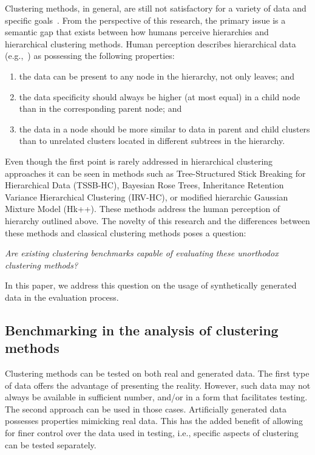 \documentclass{article}
\begin{document}
Clustering methods, in general, are still not satisfactory for a variety of data and specific goals~\cite{blundell2010discovering}. From the perspective of this research, the primary issue is a semantic gap that exists between how humans perceive hierarchies and hierarchical clustering methods. Human perception describes hierarchical data (e.g.,~\cite{ILSVRC15}) as possessing the following properties:
\begin{enumerate}
    \item the data can be present to any node in the hierarchy, not only leaves; and
    \item the data specificity should always be higher (at most equal) in a child node than in the corresponding parent node; and
    \item the data in a node should be more similar to data in parent and child clusters than to unrelated clusters located in different subtrees in the hierarchy.
\end{enumerate}

Even though the first point is rarely addressed in hierarchical clustering approaches it can be seen in methods such as Tree-Structured Stick Breaking for Hierarchical Data (TSSB-HC)\cite{ghahramani2010tree}, Bayesian Rose Trees\cite{2010_bayesian_rose_trees}, Inheritance Retention Variance Hierarchical Clustering (IRV-HC)\cite{Spytkowski2012}, or modified hierarchic Gaussian Mixture Model (Hk++)\cite{Olech2016}. These methods address the human perception of hierarchy outlined above. The novelty of this research and the differences between these methods and classical clustering methods poses a question:

\textit{Are existing clustering benchmarks capable of evaluating these unorthodox clustering methods?}

In this paper, we address this question on the usage of synthetically generated data in the evaluation process.

\subsection{Benchmarking in the analysis of clustering methods}

Clustering methods can be tested on both real and generated data. The first type of data offers the advantage of presenting the reality. However, such data may not always be available in sufficient number, and/or in a form that facilitates testing. The second approach can be used in those cases. Artificially generated data possesses properties mimicking real data. This has the added benefit of allowing for finer control over the data used in testing, i.e., specific aspects of clustering can be tested separately.
\end{document}
